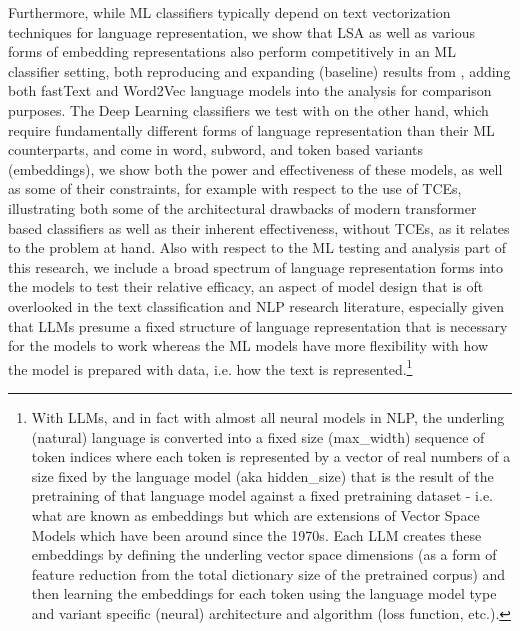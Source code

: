 \documentclass[final]{clv2025-revised}
\begin{document}
Furthermore, while ML classifiers typically depend on text vectorization techniques for language representation, we show that LSA as well as various forms of embedding representations also perform competitively in an ML classifier setting, both reproducing and expanding (baseline) results from \cite{moreo2021}, adding both fastText and Word2Vec language models into the analysis for comparison purposes. The Deep Learning classifiers we test with on the other hand, which require fundamentally different forms of language representation than their ML counterparts, and come in word, subword, and token based variants (embeddings), we show both the power and effectiveness of these models, as well as some of their constraints, for example with respect to the use of TCEs, illustrating both some of the architectural drawbacks of modern transformer based classifiers as well as their inherent effectiveness, without TCEs, as it relates to the problem at hand. Also with respect to the ML testing and analysis part of this research, we include a broad spectrum of language representation forms into the models to test their relative efficacy, an aspect of model design that is oft overlooked in the text classification and NLP research literature, especially given that LLMs presume a fixed structure of language representation that is necessary for the models to work whereas the ML models have more flexibility with how the model is prepared with data, i.e. how the text is represented.\footnote{With LLMs, and in fact with almost all neural models in NLP, the underling (natural) language is converted into a fixed size (max\_width) sequence of token indices where each token is represented by a vector of real numbers of a size fixed by the language model (aka hidden\_size) that is the result of the pretraining of that language model against a fixed pretraining dataset - i.e. what are known as embeddings but which are extensions of Vector Space Models which have been around since the 1970s. Each LLM creates these embeddings by defining the underling vector space dimensions (as a form of feature reduction from the total dictionary size of the pretrained corpus) and then learning the embeddings for each token using the language model type and variant specific (neural) architecture and algorithm (loss function, etc.).} 
\end{document}
